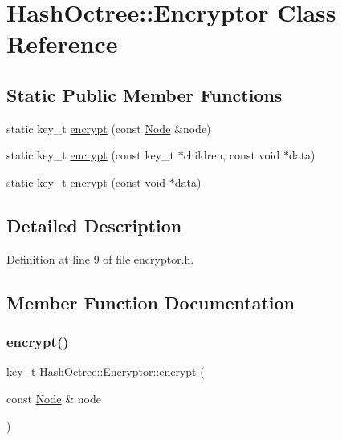 \hypertarget{class_hash_octree_1_1_encryptor}{}\section{Hash\+Octree\+::Encryptor Class Reference}
\label{class_hash_octree_1_1_encryptor}
\subsection*{Static Public Member Functions}
\begin{DoxyCompactItemize}
\item 
static key\+\_\+t \mbox{\hyperlink{class_hash_octree_1_1_encryptor_a02e1c9d854ee1d296cee98776e098fe5_a02e1c9d854ee1d296cee98776e098fe5}{encrypt}} (const \mbox{\hyperlink{class_hash_octree_1_1_node}{Node}} \&node)
\item 
static key\+\_\+t \mbox{\hyperlink{class_hash_octree_1_1_encryptor_a513e44d8beda3d37460fefdca165a9e3_a513e44d8beda3d37460fefdca165a9e3}{encrypt}} (const key\+\_\+t $\ast$children, const void $\ast$data)
\item 
static key\+\_\+t \mbox{\hyperlink{class_hash_octree_1_1_encryptor_a96ce6d479c6b28f1f61c99989aa7a976_a96ce6d479c6b28f1f61c99989aa7a976}{encrypt}} (const void $\ast$data)
\end{DoxyCompactItemize}


\subsection{Detailed Description}


Definition at line 9 of file encryptor.\+h.



\subsection{Member Function Documentation}
\mbox{\label{class_hash_octree_1_1_encryptor_a02e1c9d854ee1d296cee98776e098fe5_a02e1c9d854ee1d296cee98776e098fe5}} 
\subsubsection{\texorpdfstring{encrypt()}{encrypt()}\hspace{0.1cm}{\footnotesize\ttfamily [1/3]}}
{\footnotesize\ttfamily key\+\_\+t Hash\+Octree\+::\+Encryptor\+::encrypt (\begin{DoxyParamCaption}\item[{const \mbox{\hyperlink{class_hash_octree_1_1_node}{Node}} \&}]{node }\end{DoxyParamCaption})\hspace{0.3cm}{\ttfamily [static]}}

